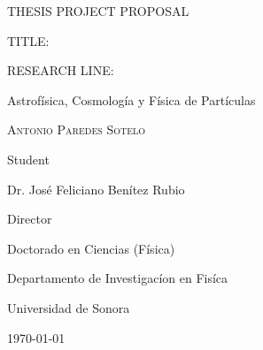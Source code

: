 \documentclass[final,3p]{CSP}
\def\Student{Antonio Paredes Sotelo}
\def\Title{THESIS PROJECT PROPOSAL}
\def\Prog{Doctorado en Ciencias (F\'{i}sica) }
\def\Dept{Departamento de Investigac\'{i}on en Fis\'{i}ca}
\def\Director{Dr. Jos\'{e} Feliciano Ben\'{i}tez Rubio}
\def\ProjectTitle{}
\def\ResearchLine{Astrof\'{i}sica, Cosmolog\'{i}a y F\'{i}sica de Part\'{i}culas}
\begin{document}
\begin{titlepage}
  \centering
  \hspace{0pt}
  \vfill
        {\scshape\Large \Title \par}

	\vspace{2cm}
        \begin{adjustwidth}{2cm}{2cm}{
            TITLE:\par
            {\large \ProjectTitle \par}
          }
        \end{adjustwidth}

	\vspace{0.5cm}
        \begin{adjustwidth}{2cm}{2cm}{
            RESEARCH LINE: \par
            \ResearchLine \par}
        \end{adjustwidth}

        
        \vspace{4cm}
        {\underline{\hspace{8cm}}\par}
	{\scshape\large \Student \par}
        {Student\par}

        \vspace{1cm}
        {\underline{\hspace{8cm}}\par}
	{\Director \par}
        {Director\par}

        \vspace{1cm}
        {\Prog \par}
        {\Dept \par}
        {Universidad de Sonora \par}

        \vspace{4cm}
	{\today}

\hspace{0pt}
\vfill

\end{titlepage}


\shipout\null


\newpage
\hspace{2pt}
\vfill
\end{document}
